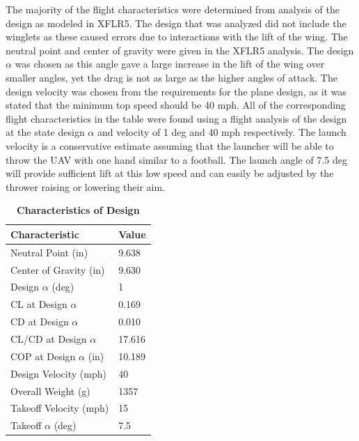    The majority of the flight characteristics were determined from analysis of the design as modeled in XFLR5. The design that was analyzed did not include the winglets as these caused errors due to interactions with the lift of the wing. The neutral point and center of gravity were given in the XFLR5 analysis. The design $\alpha$ was chosen as this angle gave a large increase in the lift of the wing over smaller angles, yet the drag is not as large as the higher angles of attack. The design velocity was chosen from the requirements for the plane design, as it was stated that the minimum top speed should be 40 mph. All of the corresponding flight characteristics in the table were found using a flight analysis of the design at the state design $\alpha$ and velocity of 1 deg and 40 mph respectively. The launch velocity is a conservative estimate assuming that the launcher will be able to throw the UAV with one hand similar to a football. The launch angle of 7.5 deg will provide sufficient lift at this low speed and can easily be adjusted by the thrower raising or lowering their aim.

    \begin{table}[H]
        \begin{center}
        \caption{\textbf{Characteristics of Design}} \label{table:Weights}
        \begin{tabular}{|p{1.6in}|p{.8in}|} %
        \hline
            \textbf{Characteristic} & \textbf{Value} \\ \hline
            Neutral Point (in) & 9.638 \\ \hline
            Center of Gravity (in) & 9.630 \\ \hline
            Design $\alpha$ (deg) & 1 \\ \hline
            CL at Design $\alpha$ & 0.169 \\ \hline
            CD at Design $\alpha$ & 0.010 \\ \hline
            CL/CD at Design $\alpha$ & 17.616 \\ \hline
            COP at Design $\alpha$ (in) & 10.189 \\ \hline
            Design Velocity (mph) & 40 \\ \hline
            Overall Weight (g) & 1357 \\ \hline
            Takeoff Velocity (mph) & 15 \\ \hline
            Takeoff $\alpha$ (deg) & 7.5 \\ \hline
        \end{tabular}
        \end{center}
    \end{table}

